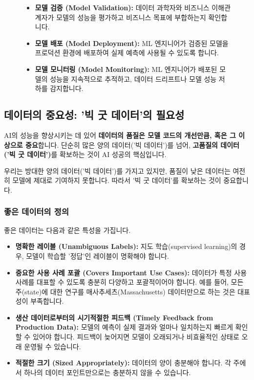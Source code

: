 \documentclass[11pt,a4paper]{article}
\begin{document}
\begin{figure}[h!]
\begin{itemize}
        \item \textbf{모델 검증 (Model Validation):} 데이터 과학자와 비즈니스 이해관계자가 모델의 성능을 평가하고 비즈니스 목표에 부합하는지 확인합니다.
        \item \textbf{모델 배포 (Model Deployment):} ML 엔지니어가 검증된 모델을 프로덕션 환경에 배포하여 실제 예측에 사용될 수 있도록 합니다.
        \item \textbf{모델 모니터링 (Model Monitoring):} ML 엔지니어가 배포된 모델의 성능을 지속적으로 추적하고, 데이터 드리프트나 모델 성능 저하를 감지합니다.
    \end{itemize}
\end{figure}

\subsection{데이터의 중요성: '빅 굿 데이터'의 필요성}

\begin{summarybox}
AI의 성능을 향상시키는 데 있어 \textbf{데이터의 품질은 모델 코드의 개선만큼, 혹은 그 이상으로 중요}합니다. 단순히 많은 양의 데이터('빅 데이터')를 넘어, \textbf{고품질의 데이터('빅 굿 데이터')}를 확보하는 것이 AI 성공의 핵심입니다.
\end{summarybox}

우리는 방대한 양의 데이터('빅 데이터')를 가지고 있지만, 품질이 낮은 데이터는 여전히 모델에 제대로 기여하지 못합니다. 따라서 '빅 굿 데이터'를 확보하는 것이 중요합니다.

\subsubsection{좋은 데이터의 정의}
좋은 데이터는 다음과 같은 특성을 가집니다.
\begin{itemize}
    \item \textbf{명확한 레이블 (Unambiguous Labels):} 지도 학습(supervised learning)의 경우, 모델이 학습할 '정답'인 레이블이 명확해야 합니다.
    \item \textbf{중요한 사용 사례 포괄 (Covers Important Use Cases):} 데이터가 특정 사용 사례를 대표할 수 있도록 충분히 다양하고 포괄적이어야 합니다. 예를 들어, 모든 주(state)에 대한 연구를 매사추세츠(Massachusetts) 데이터만으로 하는 것은 대표성이 부족합니다.
    \item \textbf{생산 데이터로부터의 시기적절한 피드백 (Timely Feedback from Production Data):} 모델의 예측이 실제 결과와 얼마나 일치하는지 빠르게 확인할 수 있어야 합니다. 피드백이 늦어지면 모델이 오래되거나 비효율적인 상태로 오래 운영될 수 있습니다.
    \item \textbf{적절한 크기 (Sized Appropriately):} 데이터의 양이 충분해야 합니다. 각 주에서 하나의 데이터 포인트만으로는 충분하지 않을 수 있습니다.
\end{itemize}
\end{document}
